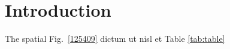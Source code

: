 \section{Introduction}
\label{introduction}

The spatial Fig.~\ref{125409} dictum ut nisl et Table \ref{tab:table}
